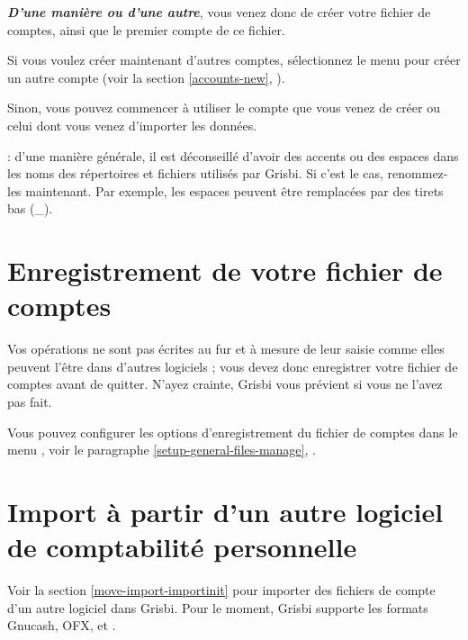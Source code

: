 \textit{\textbf{D'une manière ou d'une autre}}, vous venez donc de créer votre fichier de comptes, ainsi que le premier compte de ce fichier. 

Si vous voulez créer maintenant d'autres comptes, sélectionnez le menu  pour créer un autre compte (voir la section \vref{accounts-new}, ).

Sinon, vous pouvez commencer à utiliser le compte que vous venez de créer ou celui dont vous venez d'importer les données.

 : d'une manière générale, il est déconseillé d'avoir des accents ou des espaces dans les noms des répertoires et fichiers utilisés par Grisbi. Si c'est le cas, renommez-les maintenant. Par exemple, les espaces peuvent être remplacées par des tirets bas (\_).

\newpage


\section{Enregistrement de votre fichier de comptes\label{start-save}}


Vos opérations ne sont pas écrites au fur et à mesure de leur saisie comme 
elles peuvent l'être dans d'autres logiciels ; vous devez donc enregistrer votre fichier de comptes avant de quitter. N'ayez crainte, Grisbi vous prévient si vous ne l'avez pas fait. 

Vous pouvez configurer les options d'enregistrement du fichier de comptes dans le menu , voir le paragraphe \vref{setup-general-files-manage}, .


\section{Import à partir d'un autre logiciel de comptabilité personnelle}

Voir la section \vref{move-import-importinit} pour importer des fichiers de compte d'un autre logiciel dans Grisbi.  Pour le moment, Grisbi supporte
les formats \gls{Gnucash}, \gls{OFX},  et .


